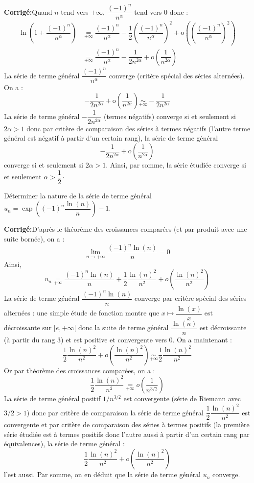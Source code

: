 \documentclass[a4paper,twoside,french,10pt]{VcCours}
\newcommand{\corr}{\textbf{Corrigé:}}
\begin{document}
\corr Quand $n$ tend vers $+ \infty$, $\dfrac{(-1)^n}{n^{\alpha}}$ tend vers $0$ donc :
\begin{align*}
 \ln \left( 1 + \dfrac{(-1)^n}{n^{\alpha}} \right) & \underset{+ \infty}{=} \dfrac{(-1)^n}{n^{\alpha}} - \dfrac{1}{2} \left(\dfrac{(-1)^n}{n^{\alpha}} \right)^2 + \textrm{o} \left(\left(\dfrac{(-1)^n}{n^{\alpha}} \right)^2\right) \\
 & \underset{+ \infty}{=} \dfrac{(-1)^n}{n^{\alpha}} - \dfrac{1}{2n^{2\alpha}} +  \textrm{o} \left( \dfrac{1}{n^{2 \alpha}} \right)
 \end{align*}
 La série de terme général $\dfrac{(-1)^n}{n^{\alpha}}$ converge (critère spécial des séries alternées). On a :
 $$  - \dfrac{1}{2n^{2\alpha}} +  \textrm{o} \left( \dfrac{1}{n^{2 \alpha}} \right) \underset{+\infty}{\sim}  - \dfrac{1}{2n^{2\alpha}}$$
 La série de terme général $- \dfrac{1}{2n^{2\alpha}}$ (termes négatifs) converge si et seulement si $2 \alpha>1$ donc par critère de comparaison des séries à termes négatifs (l'autre terme général est négatif à partir d'un certain rang), la série de terme général 
$$  - \dfrac{1}{2n^{2\alpha}} +  \textrm{o} \left( \dfrac{1}{n^{2 \alpha}} \right)$$
converge si et seulement si $2 \alpha>1$. Ainsi, par somme, la série étudiée converge si et seulement $\alpha > \dfrac{1}{2} \cdot$

\medskip


\begin{Exercice}{} Déterminer la nature de la série de terme général $u_n = \exp \left( (-1)^n \dfrac{\ln(n)}{n} \right)-1$.
\end{Exercice}

\corr D'après le théorème des croissances comparées (et par produit avec une suite bornée), on a :
$$ \lim_{n \rightarrow + \infty} \dfrac{(-1)^n \ln(n)}{n}=0$$
Ainsi,
$$ u_n \underset{+ \infty}{=}  \dfrac{(-1)^n \ln(n)}{n} + \dfrac{1}{2}  \dfrac{\ln(n)^2}{n^2} + o \left(  \dfrac{\ln(n)^2}{n^2} \right)$$
La série de terme général $\dfrac{(-1)^n \ln(n)}{n}$ converge par critère spécial des séries alternées : une simple étude de fonction montre que $x \mapsto \dfrac{\ln(x)}{x}$ est décroissante sur $[e, + \infty[$ donc la suite de terme général $ \dfrac{\ln(n)}{n}$ est décroissante (à partir du rang $3$) et est positive et convergente vers $0$. On a maintenant :
$$ \dfrac{1}{2}  \dfrac{\ln(n)^2}{n^2} + o \left(  \dfrac{\ln(n)^2}{n^2} \right) \underset{+ \infty}{\sim}  \dfrac{1}{2}  \dfrac{\ln(n)^2}{n^2}$$
Or par théorème des croissances comparées, on a :
$$ \dfrac{1}{2}  \dfrac{\ln(n)^2}{n^2} \underset{+ \infty}{=} o \left( \dfrac{1}{n^{3/2}}\right)$$
La série de terme général positif $1/n^{3/2}$ est convergente (série de Riemann avec $3/2>1$) donc par critère de comparaison la série de terme général $\dfrac{1}{2}  \dfrac{\ln(n)^2}{n^2}$ est convergente et par critère de comparaison des séries à termes positifs (la première série étudiée est à termes positifs donc l'autre aussi à partir d'un certain rang par équivalences), la série de terme général :
$$ \dfrac{1}{2}  \dfrac{\ln(n)^2}{n^2} + o \left(  \dfrac{\ln(n)^2}{n^2} \right) $$
l'est aussi. Par somme, on en déduit que la série de terme général $u_n$ converge.
\end{document}
